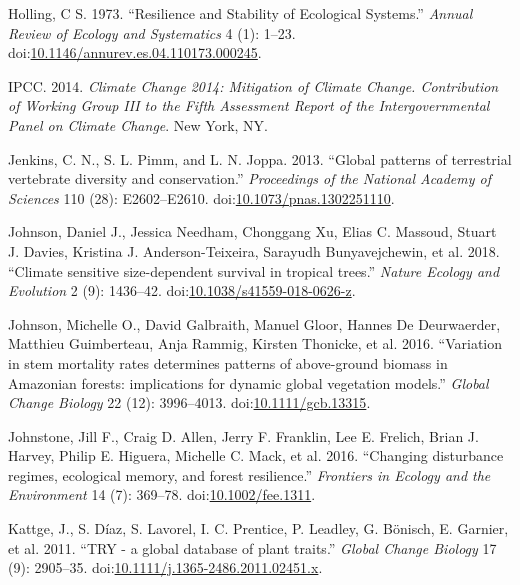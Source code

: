 \documentclass[]{elsarticle} %
\begin{document}
\hypertarget{ref-Holling1973}{}
Holling, C S. 1973. ``Resilience and Stability of Ecological Systems.''
\emph{Annual Review of Ecology and Systematics} 4 (1): 1--23.
doi:\href{https://doi.org/10.1146/annurev.es.04.110173.000245}{10.1146/annurev.es.04.110173.000245}.

\hypertarget{ref-IPCC2014}{}
IPCC. 2014. \emph{Climate Change 2014: Mitigation of Climate Change.
Contribution of Working Group III to the Fifth Assessment Report of the
Intergovernmental Panel on Climate Change}. New York, NY.

\hypertarget{ref-Jenkins2013}{}
Jenkins, C. N., S. L. Pimm, and L. N. Joppa. 2013. ``Global patterns of
terrestrial vertebrate diversity and conservation.'' \emph{Proceedings
of the National Academy of Sciences} 110 (28): E2602--E2610.
doi:\href{https://doi.org/10.1073/pnas.1302251110}{10.1073/pnas.1302251110}.

\hypertarget{ref-Johnson2018}{}
Johnson, Daniel J., Jessica Needham, Chonggang Xu, Elias C. Massoud,
Stuart J. Davies, Kristina J. Anderson-Teixeira, Sarayudh
Bunyavejchewin, et al. 2018. ``Climate sensitive size-dependent survival
in tropical trees.'' \emph{Nature Ecology and Evolution} 2 (9):
1436--42.
doi:\href{https://doi.org/10.1038/s41559-018-0626-z}{10.1038/s41559-018-0626-z}.

\hypertarget{ref-Johnson2016}{}
Johnson, Michelle O., David Galbraith, Manuel Gloor, Hannes De
Deurwaerder, Matthieu Guimberteau, Anja Rammig, Kirsten Thonicke, et al.
2016. ``Variation in stem mortality rates determines patterns of
above-ground biomass in Amazonian forests: implications for dynamic
global vegetation models.'' \emph{Global Change Biology} 22 (12):
3996--4013.
doi:\href{https://doi.org/10.1111/gcb.13315}{10.1111/gcb.13315}.

\hypertarget{ref-Johnstone2016}{}
Johnstone, Jill F., Craig D. Allen, Jerry F. Franklin, Lee E. Frelich,
Brian J. Harvey, Philip E. Higuera, Michelle C. Mack, et al. 2016.
``Changing disturbance regimes, ecological memory, and forest
resilience.'' \emph{Frontiers in Ecology and the Environment} 14 (7):
369--78. doi:\href{https://doi.org/10.1002/fee.1311}{10.1002/fee.1311}.

\hypertarget{ref-Kattge2011}{}
Kattge, J., S. Díaz, S. Lavorel, I. C. Prentice, P. Leadley, G. Bönisch,
E. Garnier, et al. 2011. ``TRY - a global database of plant traits.''
\emph{Global Change Biology} 17 (9): 2905--35.
doi:\href{https://doi.org/10.1111/j.1365-2486.2011.02451.x}{10.1111/j.1365-2486.2011.02451.x}.
\end{document}
